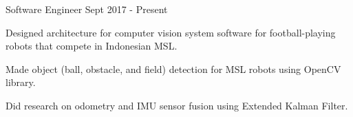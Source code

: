 \begin{cventries}
  \cventry
	{Software Engineer} %
	{} %
	{} %
	{Sept 2017 - Present} %
	{
	  \begin{cvitems} %
		\item {Designed architecture for computer vision system software for football-playing robots that compete in Indonesian MSL.}
		\item {Made object (ball, obstacle, and field) detection for MSL robots using OpenCV library.}
        \item {Did research on odometry and IMU sensor fusion using Extended Kalman Filter.}
	  \end{cvitems}
	}
\end{cventries}
